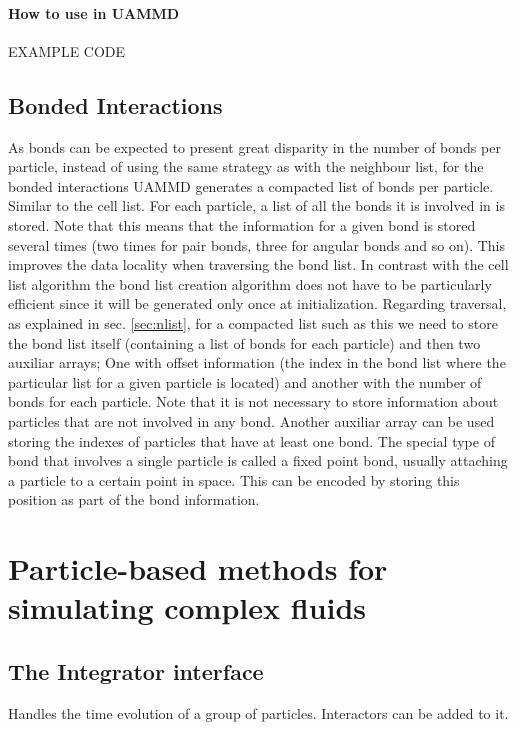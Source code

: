 \documentclass[ twoside,openright,titlepage,numbers=noenddot,%
headinclude,footinclude,cleardoublepage=empty,abstract=on,
BCOR=5mm,paper=a4,fontsize=11pt, dvipsnames
]{scrreprt}
\newcommand{\uammd}{\gls{UAMMD}\xspace}
\begin{document}
\subsubsection{How to use in UAMMD}

EXAMPLE CODE

\section{Bonded Interactions}

As bonds can be expected to present great disparity in the number of bonds per particle, instead of using the same strategy as with the neighbour list, for the bonded interactions \uammd generates a compacted list of bonds per particle. Similar to the cell list.
For each particle, a list of all the bonds it is involved in is stored. Note that this means that the information for a given bond is stored several times (two times for pair bonds, three for angular bonds and so on).
This improves the data locality when traversing the bond list.
In contrast with the cell list algorithm the bond list creation algorithm does not have to be particularly efficient since it will be generated only once at initialization.
Regarding traversal, as explained in sec. \ref{sec:nlist}, for a compacted list such as this we need to store the bond list itself (containing a list of bonds for each particle) and then two auxiliar arrays; One with offset information (the index in the bond list where the particular list for a given particle is located) and another with the number of bonds for each particle.
Note that it is not necessary to store information about particles that are not involved in any bond. Another auxiliar array can be used storing the indexes of particles that have at least one bond.
The special type of bond that involves a single particle is called a fixed point bond, usually attaching a particle to a certain point in space. This can be encoded by storing this position as part of the bond information.


\chapter{Particle-based methods for simulating complex fluids}

\section{The Integrator interface}\label{sec:integrator}
Handles the time evolution of a group of particles.
Interactors can be added to it.
\end{document}
